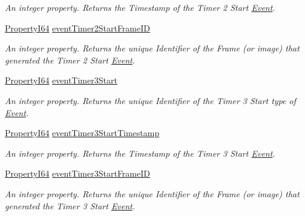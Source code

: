 \begin{DoxyCompactItemize}
\begin{DoxyCompactList}\small\item\em An integer property. Returns the Timestamp of the Timer 2 Start \hyperlink{classmv_i_m_p_a_c_t_1_1acquire_1_1_event}{Event}. \end{DoxyCompactList}\item 
\hyperlink{group___common_interface_ga81749b2696755513663492664a18a893}{Property\+I64} \hyperlink{classmv_i_m_p_a_c_t_1_1acquire_1_1_gen_i_cam_1_1_event_control_a751486bdb06db0ed8e4a62722fd6e68e}{event\+Timer2\+Start\+Frame\+I\+D}
\begin{DoxyCompactList}\small\item\em An integer property. Returns the unique Identifier of the Frame (or image) that generated the Timer 2 Start \hyperlink{classmv_i_m_p_a_c_t_1_1acquire_1_1_event}{Event}. \end{DoxyCompactList}\item 
\hyperlink{group___common_interface_ga81749b2696755513663492664a18a893}{Property\+I64} \hyperlink{classmv_i_m_p_a_c_t_1_1acquire_1_1_gen_i_cam_1_1_event_control_a3b5d01a02daa681a65fead174b9c468a}{event\+Timer3\+Start}
\begin{DoxyCompactList}\small\item\em An integer property. Returns the unique Identifier of the Timer 3 Start type of \hyperlink{classmv_i_m_p_a_c_t_1_1acquire_1_1_event}{Event}. \end{DoxyCompactList}\item 
\hyperlink{group___common_interface_ga81749b2696755513663492664a18a893}{Property\+I64} \hyperlink{classmv_i_m_p_a_c_t_1_1acquire_1_1_gen_i_cam_1_1_event_control_a196b4aaa8b91ca3c0e743ae8e18ecc46}{event\+Timer3\+Start\+Timestamp}
\begin{DoxyCompactList}\small\item\em An integer property. Returns the Timestamp of the Timer 3 Start \hyperlink{classmv_i_m_p_a_c_t_1_1acquire_1_1_event}{Event}. \end{DoxyCompactList}\item 
\hyperlink{group___common_interface_ga81749b2696755513663492664a18a893}{Property\+I64} \hyperlink{classmv_i_m_p_a_c_t_1_1acquire_1_1_gen_i_cam_1_1_event_control_a5b58090f21c556be3591b13d1e97b082}{event\+Timer3\+Start\+Frame\+I\+D}
\begin{DoxyCompactList}\small\item\em An integer property. Returns the unique Identifier of the Frame (or image) that generated the Timer 3 Start \hyperlink{classmv_i_m_p_a_c_t_1_1acquire_1_1_event}{Event}. \end{DoxyCompactList}\item 

\end{DoxyCompactItemize}
